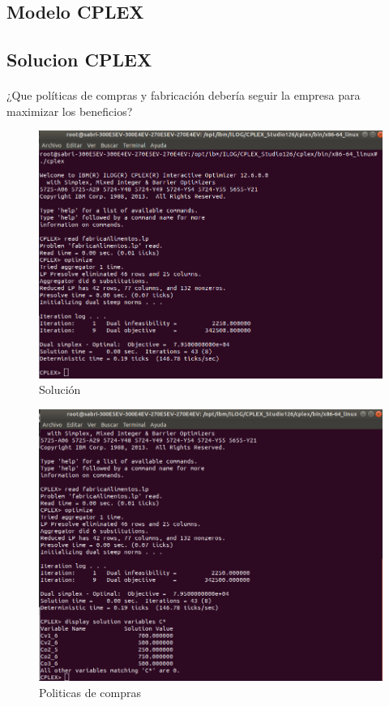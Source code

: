 \subsection{Modelo CPLEX}



\subsection{Solucion CPLEX}
\paragraph{}¿Que políticas de compras y fabricación debería seguir la empresa para maximizar los beneficios?  

\begin{figure}[!h]
    \centering
    \includegraphics[scale=0.35]{modelos/fabricaAlimentos12-1Solucion.png}
    \caption{Solución}
\end{figure}

\begin{figure}[!h]
    \centering
    \includegraphics[scale=0.35]{modelos/fabricaAlimentos12-1Compras.png}
    \caption{Politicas de compras}
\end{figure}

